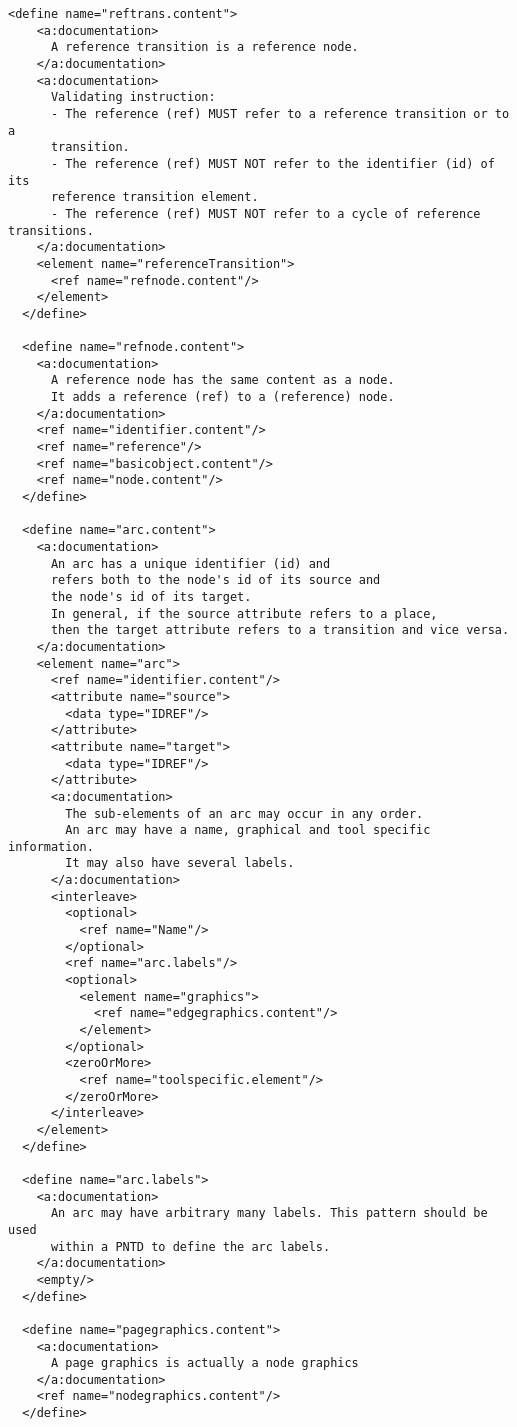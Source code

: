 \begin{lstlisting}[label=grammar_core,caption=RELAX NG implementation of PNML Core Model]
  <define name="reftrans.content">
    <a:documentation>
      A reference transition is a reference node.
    </a:documentation>
    <a:documentation>
      Validating instruction: 
      - The reference (ref) MUST refer to a reference transition or to a 
      transition.
      - The reference (ref) MUST NOT refer to the identifier (id) of its
      reference transition element.
      - The reference (ref) MUST NOT refer to a cycle of reference transitions.
    </a:documentation>
    <element name="referenceTransition">
      <ref name="refnode.content"/>
    </element>
  </define>

  <define name="refnode.content">
    <a:documentation>
      A reference node has the same content as a node.
      It adds a reference (ref) to a (reference) node.
    </a:documentation>
    <ref name="identifier.content"/>
    <ref name="reference"/>
    <ref name="basicobject.content"/>
    <ref name="node.content"/>  
  </define>

  <define name="arc.content">
    <a:documentation>
      An arc has a unique identifier (id) and
      refers both to the node's id of its source and 
      the node's id of its target.
      In general, if the source attribute refers to a place, 
      then the target attribute refers to a transition and vice versa.
    </a:documentation>
    <element name="arc">
      <ref name="identifier.content"/>
      <attribute name="source">
        <data type="IDREF"/>
      </attribute>
      <attribute name="target">
        <data type="IDREF"/>
      </attribute>
      <a:documentation>
        The sub-elements of an arc may occur in any order.
        An arc may have a name, graphical and tool specific information.
        It may also have several labels.
      </a:documentation>
      <interleave>
        <optional>
          <ref name="Name"/>
        </optional>
        <ref name="arc.labels"/>
        <optional>
          <element name="graphics">
            <ref name="edgegraphics.content"/>
          </element>
        </optional>
        <zeroOrMore>
          <ref name="toolspecific.element"/>
        </zeroOrMore>
      </interleave>
    </element>
  </define>

  <define name="arc.labels">
    <a:documentation>
      An arc may have arbitrary many labels. This pattern should be used
      within a PNTD to define the arc labels.
    </a:documentation>
    <empty/>
  </define>

  <define name="pagegraphics.content">
    <a:documentation>
      A page graphics is actually a node graphics
    </a:documentation>
    <ref name="nodegraphics.content"/> 
  </define>


\end{lstlisting}
